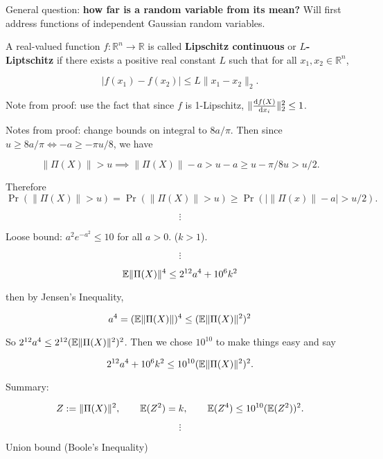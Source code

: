General question: \textbf{how far is a random variable from its mean?} Will first address functions of independent Gaussian random variables.

\begin{definition}A real-valued function \(f:\mathbb{R}^n \to \mathbb{R}\) is called \textbf{Lipschitz continuous} or \textbf{\(L\)-Liptschitz} if there exists a positive real constant \(L\) such that for all \(x_1, x_2 \in \mathbb{R}^n\), 

\[
|f(x_1) - f(x_2)| \leq L \lVert x_1 - x_2 \rVert_2.
\]

\end{definition}

\begin{theorem}

Note from proof: use the fact that since \(f\) is 1-Lipschitz, \( \lVert \deriv{f(X)}{x_i} \rVert_2^2 \leq 1\).

\end{theorem}

\begin{theorem}

Notes from proof: change bounds on integral to \(8a/\pi\). Then since \(u \geq 8a/\pi \iff -a \geq - \pi u/8\), we have

\[
\lVert \Pi(X) \rVert  > u \implies \lVert \Pi(X) \rVert - a > u - a \geq u - \pi/8 u > u/2.
\]

Therefore 
\[
\Pr(\lVert \Pi (X) \rVert > u) = \Pr(\lVert \Pi( X) \rVert > u)  \geq \Pr( | \lVert \Pi(x) \rVert -a | > u/2) .
\]

\[
\vdots
\]

Loose bound: \(a^2 e^{-a^2} \leq 10\) for all \(a > 0\). (\(k > 1\)).

\[
\vdots
\]

\[
\E \lVert \Pi(X) \rVert ^4 \leq 2^{12} a^4 + 10^6 k^2
\]

then by Jensen's Inequality, 

\[
a^4 = ( \E \lVert \Pi(X) \rVert)^4 \leq ( \E \lVert \Pi(X) \rVert^2)^2
\]

So \(2^{12} a^4 \leq 2^{12}  ( \E \lVert \Pi(X) \rVert^2)^2\). Then we chose \(10^{10}\) to make things easy and say

\[
2^{12}a^4 + 10^6 k^2 \leq 10^{10} ( \E \lVert \Pi(X) \rVert^2)^2.
\]

Summary:

\[
Z:= \lVert \Pi(X) \rVert^2, \qquad \E(Z^2) = k, \qquad \E (Z^4) \leq 10^{10} (\E (Z^2))^2.
\]

\[
\vdots
\]

Union bound (Boole's Inequality)

\end{theorem}


